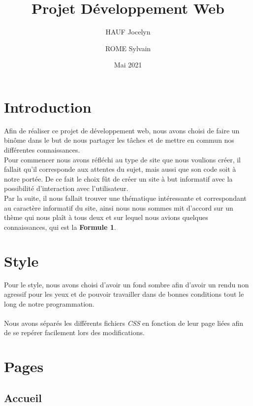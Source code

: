 \documentclass{article}
\title{Projet Développement Web}
\author{HAUF Jocelyn \and ROME Sylvain}
\date{Mai 2021}
\begin{document}
\maketitle

\newpage

\tableofcontents

\newpage

\section{Introduction}


Afin de réaliser ce projet de développement web, nous avons choisi de faire un binôme dans le but de nous partager les tâches et de mettre en commun nos différentes connaissances.\\
Pour commencer nous avons réfléchi au type de site que nous voulions créer, il fallait qu'il corresponde aux attentes du sujet, mais aussi que son code soit à notre portée. De ce fait le choix fût de créer un site à but informatif avec la possibilité d'interaction avec l'utilisateur.\\

Par la suite, il nous fallait trouver une thématique intéressante et correspondant au caractère informatif du site, ainsi nous nous sommes mit d'accord sur un thème qui nous plaît à tous deux et sur lequel nous avions quelques connaissances, qui est la \textbf{Formule 1}.\\

\section{Style}

Pour le style, nous avons choisi d'avoir un fond sombre afin d'avoir un rendu non agressif pour les yeux et de pouvoir travailler dans de bonnes conditions tout le long de notre programmation.\\
\\

Nous avons séparés les différents fichiers \emph{CSS} en fonction de leur page liées afin de se repérer facilement lors des modifications.\\

\section{Pages}
\subsection{Accueil}
\end{document}
